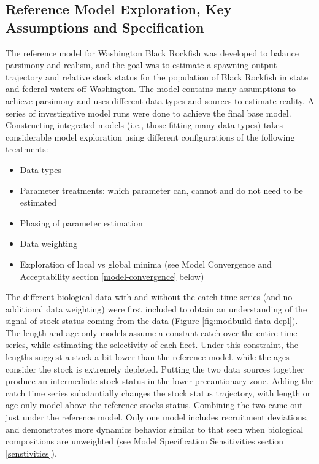 \documentclass[11pt,
  english,
  letterpaper,
]{article}
\providecommand{\tightlist}{%
  \setlength{\itemsep}{0pt}\setlength{\parskip}{0pt}}
\providecommand{\tightlist}{%
  \setlength{\itemsep}{0pt}\setlength{\parskip}{0pt}}
\begin{document}
\hypertarget{reference-model-exploration-key-assumptions-and-specification}{%
\subsection{Reference Model Exploration, Key Assumptions and Specification}\label{reference-model-exploration-key-assumptions-and-specification}}

The reference model for Washington Black Rockfish was developed to balance parsimony and realism, and the goal was to estimate a spawning output trajectory and relative stock status for the population of Black Rockfish in state and federal waters off Washington. The model contains many assumptions to achieve parsimony and uses different data types and sources to estimate reality. A series of investigative model runs were done to achieve the final base model. Constructing integrated models (i.e., those fitting many data types) takes considerable model exploration using different configurations of the following treatments:

\begin{itemize}
\tightlist
\item
  Data types
\item
  Parameter treatments: which parameter can, cannot and do not need to be estimated
\item
  Phasing of parameter estimation
\item
  Data weighting
\item
  Exploration of local vs global minima (see Model Convergence and Acceptability section \ref{model-convergence} below)
\end{itemize}

The different biological data with and without the catch time series (and no additional data weighting) were first included to obtain an understanding of the signal of stock status coming from the data (Figure \ref{fig:modbuild-data-depl}). The length and age only models assume a constant catch over the entire time series, while estimating the selectivity of each fleet. Under this constraint, the lengths suggest a stock a bit lower than the reference model, while the ages consider the stock is extremely depleted. Putting the two data sources together produce an intermediate stock status in the lower precautionary zone. Adding the catch time series substantially changes the stock status trajectory, with length or age only model above the reference stocks status. Combining the two came out just under the reference model. Only one model includes recruitment deviations, and demonstrates more dynamics behavior similar to that seen when biological compositions are unweighted (see Model Specification Sensitivities section \ref{senstivities}).
\end{document}
